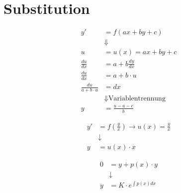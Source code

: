 \section{Substitution}

\begin{center}
\begin{align*}
y' &= f(ax+by+c) \\
&\Downarrow \\
u &= u(x) = ax +by +c\\
\frac{du}{dx} &= a + b\frac{dy}{dx}\\
\frac{du}{dx} &= a +b\cdot u\\
\frac{du}{a+b\cdot u} &= dx\\
&\Downarrow \text{Variablentrennung}\\
y &= \frac{u-a-c}{b}
\end{align*}
\end{center}

\begin{center}
\begin{align*}[box=\widebox]
y' &= f\left(\frac{y}{x}\right) \rightarrow u(x)=\frac{y}{x}\\
&\downarrow \\
y &= u(x)\cdot x
\end{align*}
\end{center}

\begin{center}
\begin{align*}[box=\widebox]
0 &= y + p(x)\cdot y \\
&\downarrow \\
y &= K\cdot e^{\int p(x)dx}
\end{align*}
\end{center}